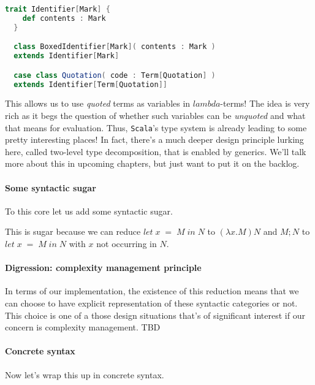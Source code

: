 \begin{lstlisting}[language=Scala]
  trait Identifier[Mark] {
    def contents : Mark
  }

  class BoxedIdentifier[Mark]( contents : Mark )
  extends Identifier[Mark]

  case class Quotation( code : Term[Quotation] )
  extends Identifier[Term[Quotation]]
\end{lstlisting}

This allows us to use \emph{quoted} terms as variables in
$lambda$-terms! The idea is very rich as it begs the question of
whether such variables can be \emph{unquoted} and what that means for
evaluation. Thus, \texttt{Scala}'s type system is already leading to
some pretty interesting places! In fact, there's a much deeper design
principle lurking here, called two-level type decomposition, that is
enabled by generics. We'll talk more about this in upcoming chapters,
but just want to put it on the backlog.

\paragraph{Some syntactic sugar}
To this core let us add some syntactic sugar.


This is sugar because we can reduce $let \; x \; = \; M \; in \; N$ to
$(\lambda x. M) N$ and $ M; N$ to $let \; x \; = \; M \; in \; N$ with
$x$ not occurring in $N$.

\paragraph{Digression: complexity management principle} In terms of
our implementation, the existence of this reduction means that we can
choose to have explicit representation of these syntactic categories
or not. This choice is one of a those design situations that's of
significant interest if our concern is complexity management. TBD

\paragraph{Concrete syntax}
Now let's wrap this up in concrete syntax.

